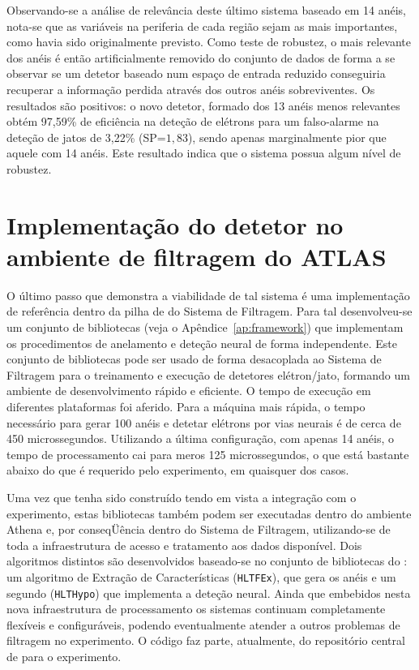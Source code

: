 Observando-se a análise de relevância deste último sistema baseado em 14
anéis, nota-se que as variáveis na periferia de cada região sejam as mais
importantes, como havia sido originalmente previsto. Como teste de robustez, o
mais relevante dos anéis é então artificialmente removido do conjunto de dados
de forma a se observar se um detetor baseado num espaço de entrada reduzido
conseguiria recuperar a informação perdida através dos outros anéis
sobreviventes. Os resultados são positivos: o novo detetor, formado dos 13
anéis menos relevantes obtém 97,59\% de eficiência na deteção de elétrons para
um falso-alarme na deteção de jatos de 3,22\% (SP=$1,83$), sendo apenas
marginalmente pior que aquele com 14 anéis. Este resultado indica que o
sistema possua algum nível de robustez.

\section{Implementação do detetor no ambiente de filtragem do ATLAS}

O último passo que demonstra a viabilidade de tal sistema é uma implementação
de referência dentro da pilha de  do Sistema de Filtragem. Para
tal desenvolveu-se um conjunto de bibliotecas (veja o
Apêndice~\ref{ap:framework}) que implementam os procedimentos de anelamento e
deteção neural de forma independente. Este conjunto de bibliotecas pode ser
usado de forma desacoplada ao Sistema de Filtragem para o treinamento e
execução de detetores elétron/jato, formando um ambiente de desenvolvimento
rápido e eficiente. O tempo de execução em diferentes plataformas foi
aferido. Para a máquina mais rápida, o tempo necessário para gerar 100 anéis e
detetar elétrons por vias neurais é de cerca de 450 microssegundos. Utilizando
a última configuração, com apenas 14 anéis, o tempo de processamento cai para
meros 125 microssegundos, o que está bastante abaixo do que é requerido pelo
experimento, em quaisquer dos casos.

Uma vez que tenha sido construído tendo em vista a integração com o
experimento, estas bibliotecas também podem ser executadas dentro do ambiente
Athena e, por conseqÜência dentro do Sistema de Filtragem, utilizando-se de
toda a infraestrutura de acesso e tratamento aos dados disponível. Dois
algoritmos distintos são desenvolvidos baseado-se no conjunto de bibliotecas
do : um algoritmo de Extração de Características
(\texttt{HLTFEx}), que gera os anéis e um segundo (\texttt{HLTHypo}) que
implementa a deteção neural. Ainda que embebidos nesta nova infraestrutura de
processamento os sistemas continuam completamente flexíveis e configuráveis,
podendo eventualmente atender a outros problemas de filtragem no
experimento. O código faz parte, atualmente, do repositório central de
 para o experimento.

